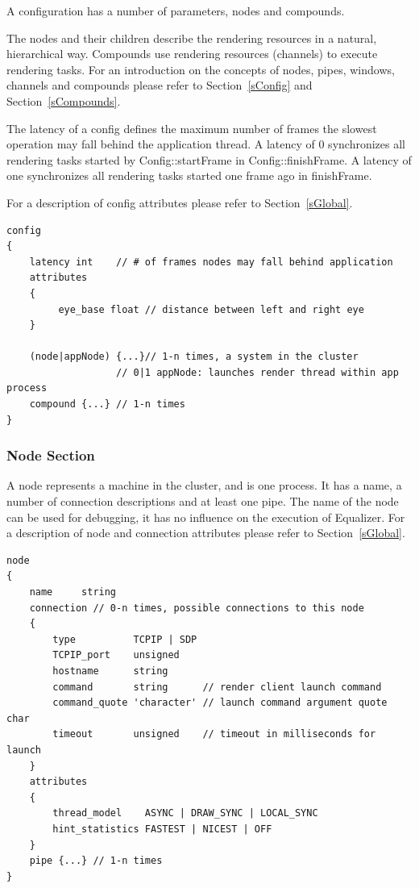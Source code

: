 \documentclass[10pt,a4]{scrartcl}
\newcommand{\sref}[1]{Section~\ref{#1}}
\begin{document}
A configuration has a number of parameters, nodes and compounds.

The nodes and their children describe the rendering resources in a
natural, hierarchical way. Compounds use rendering resources (channels)
to execute rendering tasks. For an introduction on the concepts of
nodes, pipes, windows, channels and compounds please refer to
\sref{sConfig} and \sref{sCompounds}.

The latency of a config defines the maximum number of frames the
slowest operation may fall behind the application thread. A latency of 0
synchronizes all rendering tasks started by \textsf{Config::startFrame}
in \textsf{Config::finishFrame}. A latency of one synchronizes all
rendering tasks started one frame ago in \textsf{finishFrame}.

For a description of config attributes please refer to \sref{sGlobal}.

{\footnotesize\begin{lstlisting}
config
{
    latency int    // # of frames nodes may fall behind application
    attributes
    {
         eye_base float // distance between left and right eye
    }

    (node|appNode) {...}// 1-n times, a system in the cluster
                   // 0|1 appNode: launches render thread within app process
    compound {...} // 1-n times
}
\end{lstlisting}}

\subsubsection{Node Section}

A node represents a machine in the cluster, and is one process. It has a
name, a number of connection descriptions and at least one pipe. The
name of the node can be used for debugging, it has no influence on the
execution of Equalizer. For a description of node and connection
attributes please refer to \sref{sGlobal}.

{\footnotesize\begin{lstlisting}
node
{
    name     string
    connection // 0-n times, possible connections to this node
    {
        type          TCPIP | SDP
        TCPIP_port    unsigned
        hostname      string
        command       string      // render client launch command
        command_quote 'character' // launch command argument quote char
        timeout       unsigned    // timeout in milliseconds for launch
    }
    attributes
    {
        thread_model    ASYNC | DRAW_SYNC | LOCAL_SYNC
        hint_statistics FASTEST | NICEST | OFF
    }
    pipe {...} // 1-n times
}
\end{lstlisting}}
\end{document}
